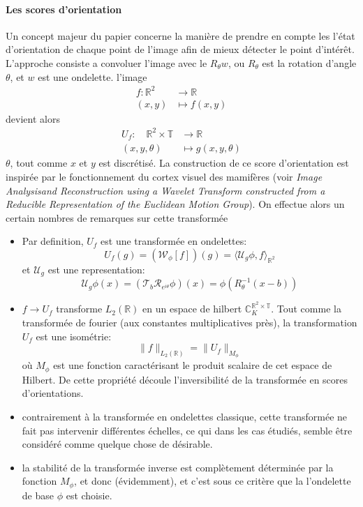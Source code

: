\documentclass{article}
\begin{document}
\paragraph{Les scores d'orientation} 
Un concept majeur du papier concerne la manière de prendre en compte les l'état
d'orientation de chaque point de l'image afin de mieux détecter le point d'intérêt.
L'approche consiste a convoluer l'image avec le $ R_{\theta} w $, ou $ R_{\theta} $ est la rotation d'angle $ \theta  $, et $ w $ est une ondelette.
l'image 
\[
    \begin{aligned}
        f: \mathbb{R}^2 &\longrightarrow \mathbb{R} \\
        (x, y) &\longmapsto f(x, y)
    \end{aligned}
\] 
devient alors 
\[
\begin{aligned}
    U_f: \quad \mathbb{R}^2\times \mathbb{ T } &\longrightarrow \mathbb{R} \\
    (x, y, \theta) &\longmapsto g(x, y, \theta)
\end{aligned}
\] 
$ \theta $, tout comme $ x $ et $ y $ est discrétisé.
La construction de ce score d'orientation est inspirée par le fonctionnement du cortex
visuel des mamifères (voir \emph{Image Analysisand Reconstruction using a Wavelet
Transform constructed from a Reducible Representation of the Euclidean Motion Group}).
On effectue alors un certain nombres de remarques sur cette transformée
\begin{itemize}
    \item Par definition, $  U_f $ est une transformée en ondelettes:
        \[
             U_f(g) =  (\mathcal W_{\phi}[f])(g)  = \langle \mathcal  U_g \phi, f
             \rangle_{\mathbb{R}^2}
        \] 
        et $ \mathcal  U_g $ est une representation:
        \[
            \mathcal  U_g \phi(x) = (\mathcal  T_b \mathcal  R_{e^{i \theta}} \phi )(x)
            = \phi \left ( R_{\theta}^{-1}(x - b) \right )
        \] 
        \item $ f  \to U_f $ transforme $ L_2(\mathbb{R}) $ en un espace de hilbert $
        \mathbb C_K^{\mathbb{R}^2 \times \mathbb{ T }} $.\newline
        Tout comme la transformée de fourier (aux constantes multiplicatives près), la
        transformation $ U_f $ est une isométrie:
        \[
            \|f\|_{L_2(\mathbb{R})} = \|U_f\|_{M_{\phi}}
        \] 
        où $ M_{\phi} $ est une fonction caractérisant le produit scalaire de cet espace
        de Hilbert.\newline
        De cette propriété découle l'inversibilité de la transformée en scores
        d'orientations.
        \item contrairement à la transformée en ondelettes classique, cette transformée
            ne fait pas intervenir différentes échelles, ce qui dans les cas étudiés,
            semble être considéré comme quelque chose de désirable.
        \item la stabilité de la transformée inverse est complètement déterminée par la
            fonction $ M_{\phi} $, et donc (évidemment), et c'est sous ce critère que la
            l'ondelette de base $ \phi $ est choisie.
\end{itemize}
\end{document}
